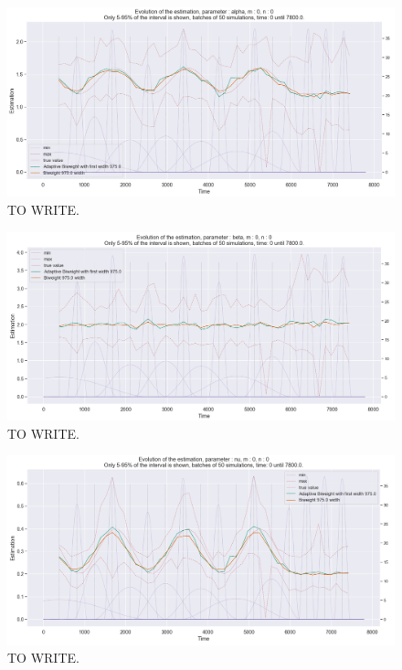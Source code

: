 \begin{figure}
\centering
\includegraphics[width = 0.90 \textwidth]{../imag/chap3/4_bis/P.png}
\caption{TO WRITE.}
\label{fig:second_estimate_4_alpha}
\end{figure}

\begin{figure}
\centering
\includegraphics[width = 0.90 \textwidth]{../imag/chap3/4_bis/Q.png}
\caption{TO WRITE.}
\label{fig:second_estimate_4_beta}
\end{figure}

\begin{figure}
\centering
\includegraphics[width = 0.90 \textwidth]{../imag/chap3/4_bis/R.png}
\caption{TO WRITE.}
\label{fig:second_estimate_4_nu}
\end{figure}









